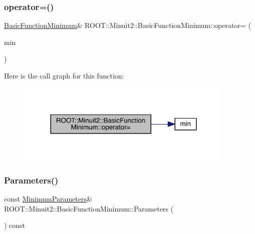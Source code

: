 \subsubsection{\texorpdfstring{operator=()}{operator=()}\hspace{0.1cm}{\footnotesize\ttfamily [2/2]}}
{\footnotesize\ttfamily \mbox{\hyperlink{classROOT_1_1Minuit2_1_1BasicFunctionMinimum}{Basic\+Function\+Minimum}}\& R\+O\+O\+T\+::\+Minuit2\+::\+Basic\+Function\+Minimum\+::operator= (\begin{DoxyParamCaption}\item[{const \mbox{\hyperlink{classROOT_1_1Minuit2_1_1BasicFunctionMinimum}{Basic\+Function\+Minimum}} \&}]{min }\end{DoxyParamCaption})\hspace{0.3cm}{\ttfamily [inline]}}

Here is the call graph for this function\+:
\nopagebreak
\begin{figure}[H]
\begin{center}
\leavevmode
\includegraphics[width=298pt]{de/d25/classROOT_1_1Minuit2_1_1BasicFunctionMinimum_ad143c1c314e041649151bac9bb9e7a91_cgraph}
\end{center}
\end{figure}
\mbox{\label{classROOT_1_1Minuit2_1_1BasicFunctionMinimum_acbbd51950f390d29541728f114b2d12e}} 
\subsubsection{\texorpdfstring{Parameters()}{Parameters()}\hspace{0.1cm}{\footnotesize\ttfamily [1/2]}}
{\footnotesize\ttfamily const \mbox{\hyperlink{classROOT_1_1Minuit2_1_1MinimumParameters}{Minimum\+Parameters}}\& R\+O\+O\+T\+::\+Minuit2\+::\+Basic\+Function\+Minimum\+::\+Parameters (\begin{DoxyParamCaption}{ }\end{DoxyParamCaption}) const\hspace{0.3cm}{\ttfamily [inline]}}

